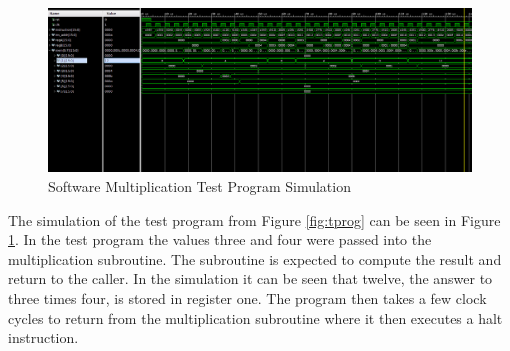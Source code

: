 \documentclass{article}
\begin{document}
	\begin{figure}[H]
		\centering
		\includegraphics[width=6in]{img/testprogsim.png}
		\caption{Software Multiplication Test Program Simulation}
		\label{fig:tprogsim}
	\end{figure}

	The simulation of the test program from Figure \ref{fig:tprog} can be seen in Figure \ref{fig:tprogsim}. In the test program the values three and four were passed into the multiplication subroutine. The subroutine is expected to compute the result and return to the caller. In the simulation it can be seen that twelve, the answer to three times four, is stored in register one. The program then takes a few clock cycles to return from the multiplication subroutine where it then executes a halt instruction. 
\end{document}
